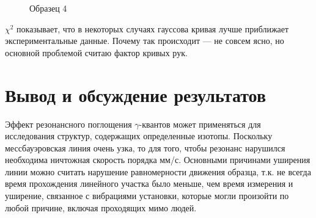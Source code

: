\documentclass[a4paper,12pt]{article}
\begin{document}
\begin{figure}[h!]
\begin{center}
\begin{minipage}{0.32\textwidth}
			\caption{Образец 4}
		\end{minipage}
	\end{center}
	\end{figure}
		$\chi^2$ показывает, что в некоторых случаях гауссова кривая лучше приближает экспериментальные данные. Почему так происходит --- не совсем ясно, но основной проблемой считаю фактор кривых рук.
		
	\section{Вывод и обсуждение результатов}
		Эффект резонансного поглощения $\gamma$-квантов может применяться для исследования структур, содержащих определенные изотопы. Поскольку мессбауэровская линия очень узка, то для того, чтобы резонанс нарушился необходима ничтожная скорость порядка мм/с. Основными причинами уширения линии можно считать нарушение равномерности движения образца, т.к. не всегда время прохождения линейного участка было меньше, чем время измерения и уширение, связанное с вибрациями установки, которые могли произойти по любой причине, включая проходящих мимо людей.
\end{document}
